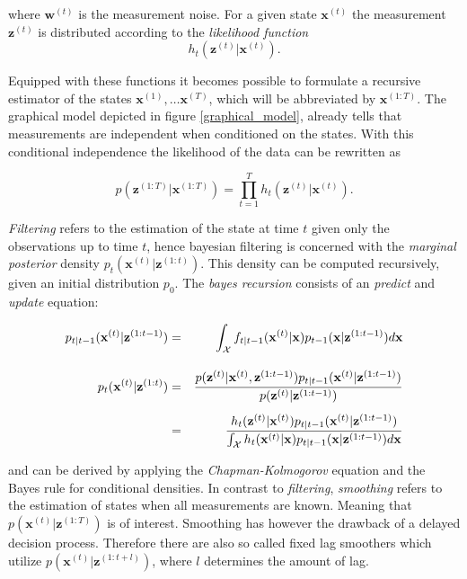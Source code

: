 \documentclass[12pt,a4paper]{article}
\begin{document}
where $\mathbf{w}^{(t)}$ is the measurement noise. For a given state $\mathbf{x}^{(t)}$ the measurement $\mathbf{z}^{(t)}$ is distributed according to the \emph{likelihood function }
$$
h_t(\mathbf{z}^{(t)} | \mathbf{x}^{(t)}).
$$

Equipped with these functions it becomes possible to formulate a recursive estimator of the states $\mathbf{x}^{(1)}, \dots \mathbf{x}^{(T)}$, which will be abbreviated by $\mathbf{x}^{(1:T)}$. The graphical model depicted in figure \ref{graphical_model}, already tells that measurements are independent when conditioned on the states. With this conditional independence the likelihood of the data can be rewritten as

$$
p(\mathbf{z}^{(1:T)} | \mathbf{x}^{(1:T)}) =  \prod_{t=1}^T h_t(\mathbf{z}^{(t)} | \mathbf{x}^{(t)}).
$$

\emph{Filtering} refers to the estimation of the state at time $t$ given only the observations up to time $t$, hence bayesian filtering is concerned with the \emph{marginal posterior} density $p_t(\mathbf{x}^{(t)} | \mathbf{z}^{(1:t)})$. This density can be computed recursively, given an initial distribution $p_0$. The \emph{bayes recursion} consists of an \emph{predict} and \emph{update} equation:

\begin{eqnarray}
	p_{t|t-1}(\mathbf{x}^{(t)} | \mathbf{z}^{(1:t-1)}) &=& \int_{\mathcal{X}} f_{t|t-1}(\mathbf{x}^{(t)} | \mathbf{x})p_{t-1}(\mathbf{x} | \mathbf{z}^{(1:t-1)})d\mathbf{x} 	\vspace{20pt} \\[10pt]
	p_t(\mathbf{x}^{(t)} | \mathbf{z}^{(1:t)}) &=& \frac{p(\mathbf{z}^{(t)} | \mathbf{x}^{(t)}, \mathbf{z}^{(1:t-1)}) p_{t|t-1}(\mathbf{x}^{(t)} | \mathbf{z}^{(1:t-1)})}{p(\mathbf{z}^{(t)} | \mathbf{z}^{(1:t-1)})} \\[5pt]
	&=& \frac{h_t(\mathbf{z}^{(t)} | \mathbf{x}^{(t)}) p_{t|t-1}(\mathbf{x}^{(t)} | \mathbf{z}^{(1:t-1)})}{\int_{\mathcal{X}} h_t(\mathbf{x}^{(t)} | \mathbf{x})p_{t|t-1}(\mathbf{x} | \mathbf{z}^{(1:t-1)})d\mathbf{x}}
\end{eqnarray}

and can be derived by applying the \emph{Chapman-Kolmogorov} equation and the Bayes rule for conditional densities. In contrast to \emph{filtering}, \emph{smoothing} refers to the estimation of states when all measurements are known. Meaning that $p(\mathbf{x}^{(t)} | \mathbf{z}^{(1:T)})$ is of interest. Smoothing has however the drawback of a delayed decision process. Therefore there are also so called fixed lag smoothers which utilize $p(\mathbf{x}^{(t)} | \mathbf{z}^{(1:t+l)})$, where $l$ determines the amount of lag.\\
\end{document}
